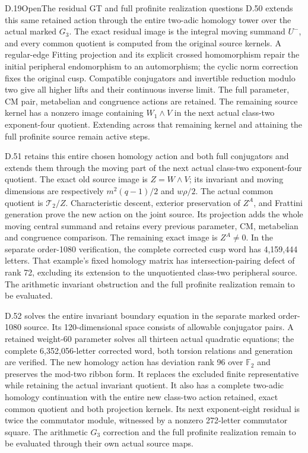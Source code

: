 \begin{statement}{D.19}{Open}{The residual GT and full profinite realization questions}
D.50 extends this same retained action through the entire
two-adic homology tower over the actual marked \(G_3\).
The exact residual image is the integral moving summand
\(U^-\), and every common quotient is computed from the
original source kernels. A regular-edge Fitting projection
and its explicit crossed homomorphism repair the initial
peripheral endomorphism to an automorphism; the cyclic
norm correction fixes the original cusp. Compatible
conjugators and invertible reduction modulo two give all
higher lifts and their continuous inverse limit. The
full parameter, CM pair, metabelian and congruence actions
are retained. The remaining source kernel has a nonzero
image containing \(W_1\wedge V\) in the next actual
class-two exponent-four quotient. Extending across that
remaining kernel and attaining the full profinite source
remain active steps.


D.51 retains this entire chosen homology action and both
full conjugators and extends them through the moving
part of the next actual class-two exponent-four quotient.
The exact old source image is \(Z=W\wedge V\); its
invariant and moving dimensions are respectively
\(m^2(q-1)/2\) and \(w\rho/2\). The actual common
quotient is \(\mathcal T_2/Z\). Characteristic descent,
exterior preservation of \(Z^A\), and Frattini generation
prove the new action on the joint source. Its projection
adds the whole moving central summand and retains every
previous parameter, CM, metabelian and congruence comparison.
The remaining exact image is \(Z^A\ne0\). In the separate
order-1080 verification, the complete corrected cusp word
has 4,159,444 letters. That example's fixed homology matrix
has intersection-pairing defect of rank 72, excluding its
extension to the unquotiented class-two peripheral source.
The arithmetic invariant obstruction and the full
profinite realization remain to be evaluated.


D.52 solves the entire invariant boundary equation in the
separate marked order-1080 source. Its 120-dimensional
space consists of allowable conjugator pairs. A retained
weight-60 parameter solves all thirteen actual quadratic
equations; the complete 6,352,056-letter corrected word,
both torsion relations and generation are verified.
The new homology action has deviation rank 96 over
\(\mathbb F_2\) and preserves the mod-two ribbon form.
It replaces the excluded finite representative while
retaining the actual invariant quotient. It also has a
complete two-adic homology continuation with the entire
new class-two action retained, exact common quotient and
both projection kernels. Its next exponent-eight residual
is twice the commutator module, witnessed by a nonzero
272-letter commutator square. The arithmetic \(G_3\)
correction and the full profinite realization remain to
be evaluated through their own actual source maps.



\end{statement}

